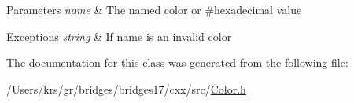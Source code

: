 \begin{DoxyParams}{Parameters}
{\em name} & The named color or \#hexadecimal value \\
\hline
\end{DoxyParams}

\begin{DoxyExceptions}{Exceptions}
{\em string} & If name is an invalid color \\
\hline
\end{DoxyExceptions}


The documentation for this class was generated from the following file\+:\begin{DoxyCompactItemize}
\item 
/\+Users/krs/gr/bridges/bridges17/cxx/src/\hyperlink{_color_8h}{Color.\+h}\end{DoxyCompactItemize}
